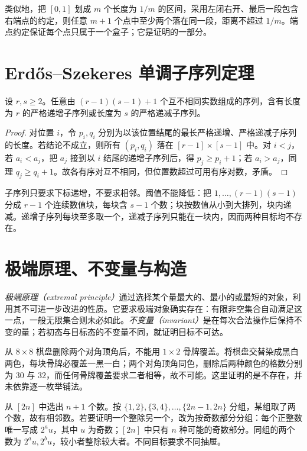 类似地，把 $[0,1]$ 划成 $m$ 个长度为 $1/m$ 的区间，采用左闭右开、最后一段包含右端点的约定，则任意 $m+1$ 个点中至少两个落在同一段，距离不超过 $1/m$。端点约定保证每个点只属于一个盒子；它是证明的一部分。

\section{Erd\H{o}s--Szekeres 单调子序列定理}

\begin{theorem}
设 $r,s\ge2$。任意由 $(r-1)(s-1)+1$ 个互不相同实数组成的序列，含有长度为 $r$ 的严格递增子序列或长度为 $s$ 的严格递减子序列。
\end{theorem}
\begin{proof}
对位置 $i$，令 $p_i,q_i$ 分别为以该位置结尾的最长严格递增、严格递减子序列的长度。若结论不成立，则所有 $(p_i,q_i)$ 落在 $[r-1]\times[s-1]$ 中。对 $i<j$，若 $a_i<a_j$，把 $a_j$ 接到以 $i$ 结尾的递增子序列后，得 $p_j\ge p_i+1$；若 $a_i>a_j$，同理 $q_j\ge q_i+1$。故各有序对互不相同，但位置数超过可用有序对数，矛盾。
\end{proof}

子序列只要求下标递增，不要求相邻。阈值不能降低：把 $1,\ldots,(r-1)(s-1)$ 分成 $r-1$ 个连续数值块，每块含 $s-1$ 个数；块按数值从小到大排列，块内递减。递增子序列每块至多取一个，递减子序列只能在一块内，因而两种目标均不存在。

\section{极端原理、不变量与构造}

\emph{极端原理（extremal principle）}通过选择某个量最大的、最小的或最短的对象，利用其不可进一步改进的性质。它要求极端对象确实存在：有限非空集合自动满足这一点，一般无限集合则未必如此。\emph{不变量（invariant）}是在每次合法操作后保持不变的量；若初态与目标态的不变量不同，就证明目标不可达。

\begin{example}[棋盘染色]
从 $8\times8$ 棋盘删除两个对角顶角后，不能用 $1\times2$ 骨牌覆盖。将棋盘交替染成黑白两色，每块骨牌必覆盖一黑一白；两个对角顶角同色，删除后两种颜色的格数分别为 $30$ 与 $32$，而任何骨牌覆盖要求二者相等，故不可能。这里证明的是不存在，并未依靠逐一枚举铺法。
\end{example}

\begin{example}[同一集合的两种抽屉]
从 $[2n]$ 中选出 $n+1$ 个数。按 $\{1,2\},\{3,4\},\ldots,\{2n-1,2n\}$ 分组，某组取了两个数，故有相邻数。若要证明一个整除另一个，改为按奇数部分分组：每个正整数唯一写成 $2^a u$，其中 $u$ 为奇数；$[2n]$ 中只有 $n$ 种可能的奇数部分。同组的两个数为 $2^a u,2^b u$，较小者整除较大者。不同目标要求不同抽屉。
\end{example}

